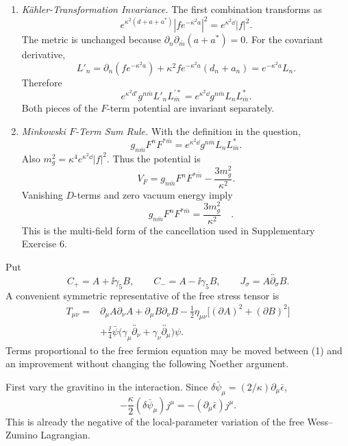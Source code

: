 \begin{enumerate}
  \begin{enumerate}
    \item \emph{Kähler-Transformation Invariance.}
    The first combination transforms as
      \[
        e^{\kappa^2(d+a+a^*)}
          |fe^{-\kappa^2a}|^2
          =e^{\kappa^2\dd}|f|^2.
      \]
      The metric is unchanged because
      \(\partial_n\partial_{\bar m}(a+a^*)=0\).  For the covariant
      derivative,
      \[
        L'_n
          =\partial_n(fe^{-\kappa^2a})
           +\kappa^2fe^{-\kappa^2a}(d_n+a_n)
          =e^{-\kappa^2a}L_n.
      \]
      Therefore
      \[
        e^{\kappa^2d'}g^{n\bar m}L'_nL_{\bar m}^{\prime *}
          =e^{\kappa^2\dd}g^{n\bar m}L_nL_{\bar m}^*.
      \]
      Both pieces of the \(F\)-term potential are invariant separately.
    \item \emph{Minkowski \(F\)-Term Sum Rule.}
    With the definition in the question,
      \[
        g_{n\bar m}F^nF^{*\bar m}
          =e^{\kappa^2\dd}g^{n\bar m}L_nL_{\bar m}^*.
      \]
      Also
      \(m_g^2=\kappa^4e^{\kappa^2\dd}|f|^2\).  Thus the potential is
      \[
        V_F=g_{n\bar m}F^nF^{*\bar m}
            -\frac{3m_g^2}{\kappa^2}.
      \]
      Vanishing \(D\)-terms and zero vacuum energy imply
      \[
        \boxed{\quad
        g_{n\bar m}F^nF^{*\bar m}
          =\frac{3m_g^2}{\kappa^2}\quad .}
      \]
      This is the multi-field form of the cancellation used in
      Supplementary Exercise 6.
  \end{enumerate}

  Put
  \[
    C_+=A+\ii\gamma_5B,
    \qquad C_-=A-\ii\gamma_5B,
    \qquad
    J_\sigma=A\overleftrightarrow{\partial_\sigma}B.
  \]
  A convenient symmetric representative of the free stress tensor is
  \[
  \begin{split}
    T_{\mu\nu}={}&\partial_\mu A\partial_\nu A
      +\partial_\mu B\partial_\nu B
      -\frac12\eta_{\mu\nu}
        \bigl[(\partial A)^2+(\partial B)^2\bigr]\\
      &+\frac{\ii}{4}\bar\psi
        \bigl(\gamma_\mu\overleftrightarrow{\partial_\nu}
             +\gamma_\nu\overleftrightarrow{\partial_\mu}\bigr)\psi .
  \end{split}
  \tag{1}
  \]
  Terms proportional to the free fermion equation may be moved between
  (1) and an improvement without changing the following Noether argument.

  First vary the gravitino in the interaction.  Since
  \(\delta\bar\psi_\mu=(2/\kappa)\partial_\mu\bar\epsilon\),
  \[
    -\frac{\kappa}{2}(\delta\bar\psi_\mu)j^\mu
      =-(\partial_\mu\bar\epsilon)j^\mu.
  \tag{2}
  \]
  This is already the negative of the local-parameter variation of the
  free Wess--Zumino Lagrangian.


\end{enumerate}
